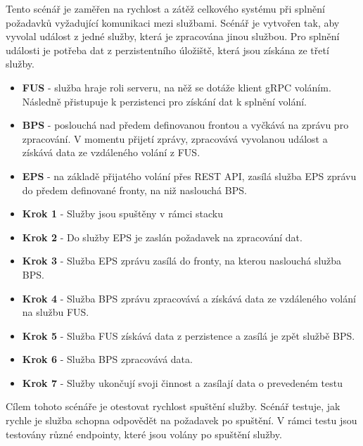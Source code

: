 
Tento scénář je zaměřen na rychlost a zátěž celkového systému při splnění požadavků vyžadující komunikaci mezi službami. Scénář je vytvořen tak, aby vyvolal událost z jedné služby, která je zpracována jinou službou. Pro splnění události je potřeba dat z perzistentního úložiště, která jsou získána ze třetí služby.



\begin{itemize}
    \item \textbf{FUS} - služba hraje roli serveru, na něž se dotáže klient gRPC voláním. Následně přistupuje k perzistenci pro získání dat k splnění volání.
    \item \textbf{BPS} - poslouchá nad předem definovanou frontou a vyčkává na zprávu pro zpracování. V momentu přijetí zprávy, zpracovává vyvolanou událost a získává data ze vzdáleného volání z FUS.
    \item \textbf{EPS} - na základě přijatého volání přes REST API, zasílá služba EPS zprávu do předem definované fronty, na niž naslouchá BPS.
\end{itemize}


\begin{itemize}
    \item \textbf{Krok 1} - Služby jsou spuštěny v rámci stacku
    \item \textbf{Krok 2} - Do služby EPS je zaslán požadavek na zpracování dat. 
    \item \textbf{Krok 3} - Služba EPS zprávu zasílá do fronty, na kterou naslouchá služba BPS. 
    \item \textbf{Krok 4} - Služba BPS zprávu zpracovává a získává data ze vzdáleného volání na službu FUS. 
    \item \textbf{Krok 5} - Služba FUS získává data z perzistence a zasílá je zpět službě BPS. 
    \item \textbf{Krok 6} - Služba BPS zpracovává data.
    \item \textbf{Krok 7} - Služby ukončují svoji činnost a zasílají data o prevedeném testu
\end{itemize}


Cílem tohoto scénáře je otestovat rychlost spuštění služby. Scénář testuje, jak rychle je služba schopna odpovědět na požadavek po spuštění. V rámci testu jsou testovány různé endpointy, které jsou volány po spuštění služby.

